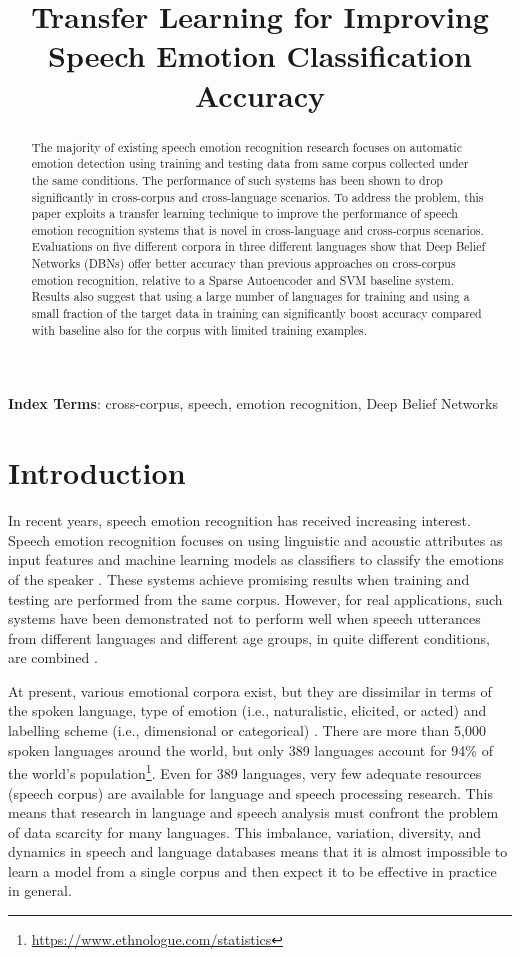 \documentclass[a4paper]{article}
\title{Transfer Learning for Improving Speech Emotion Classification Accuracy}
\begin{document}
\maketitle
\begin{abstract}
 The majority of existing speech emotion recognition research focuses on automatic emotion detection using training and testing data from same corpus collected under the same conditions. The performance of such systems has been shown to drop significantly in cross-corpus and cross-language scenarios. To address the problem, this paper exploits a transfer learning technique to improve the performance of speech emotion recognition systems that is novel in cross-language and cross-corpus scenarios. Evaluations on five different corpora in three different languages show that Deep Belief Networks (DBNs) offer better accuracy than previous approaches on cross-corpus emotion recognition, relative to a Sparse Autoencoder and SVM baseline system. Results also suggest that using a large number of languages for training and using a small fraction of the target data in training can significantly boost accuracy compared with baseline also for the corpus with limited training examples. 
\end{abstract}
\noindent\textbf{Index Terms}: cross-corpus, speech, emotion recognition, Deep Belief Networks

\section{Introduction}
\label{sec:intro}


In recent years, speech emotion recognition has received increasing interest. Speech emotion recognition focuses on using linguistic and acoustic attributes as input features and machine learning models as classifiers to classify the emotions of the speaker \cite{batliner2011automatic}. These systems achieve promising results when training and testing are performed from the same corpus. However, for real applications, such systems have been demonstrated not to perform well when speech utterances from different languages and different age groups, in quite different conditions, are combined \cite{schuller2012synthesized}. 

At present, various emotional corpora exist, but they are dissimilar in terms of the spoken language, type of emotion (i.e., naturalistic, elicited, or acted) and labelling scheme (i.e., dimensional or categorical) \cite{schuller2010cross}. There are more than 5,000 spoken languages around the world, but only 389 languages account for 94\% of the world's population\footnote{\url{https://www.ethnologue.com/statistics}}. Even for 389 languages, very few adequate resources (speech corpus) are available for language and speech processing research. This means that research in language and speech analysis must confront the problem of data scarcity for many languages. This imbalance, variation,  diversity, and dynamics in speech and language databases means that it is almost impossible to learn a model from a single corpus and then expect it to be effective in practice in general. 
  
\end{document}
